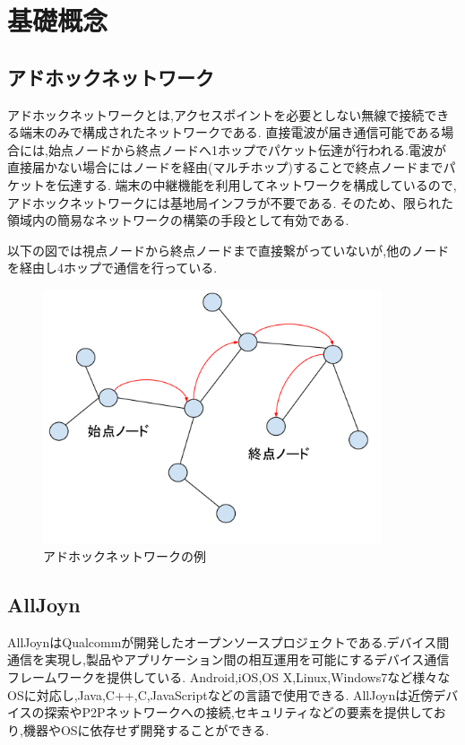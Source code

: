\chapter{基礎概念}
\label{chap:concept}

\section{アドホックネットワーク}
アドホックネットワーク\cite{アドホック}とは,アクセスポイントを必要としない無線で接続できる端末のみで構成されたネットワークである.
直接電波が届き通信可能である場合には,始点ノードから終点ノードへ1ホップでパケット伝達が行われる.電波が直接届かない場合にはノードを経由(マルチホップ)することで終点ノードまでパケットを伝達する.
端末の中継機能を利用してネットワークを構成しているので,アドホックネットワークには基地局インフラが不要である.
そのため、限られた領域内の簡易なネットワークの構築の手段として有効である.

以下の図では視点ノードから終点ノードまで直接繋がっていないが,他のノードを経由し4ホップで通信を行っている.

\begin{figure}[htbp]
\centering
\includegraphics[width=10cm]{fig/ad-hoc.pdf}
\caption{アドホックネットワークの例}
\end{figure}

\section{AllJoyn}
AllJoyn\cite{allseen}\cite{スライド}はQualcommが開発したオープンソースプロジェクトである.デバイス間通信を実現し,製品やアプリケーション間の相互運用を可能にするデバイス通信フレームワークを提供している.
Android,iOS,OS X,Linux,Windows7など様々なOSに対応し,Java,C++,C,JavaScriptなどの言語で使用できる.
AllJoynは近傍デバイスの探索やP2Pネットワークへの接続,セキュリティなどの要素を提供しており,機器やOSに依存せず開発することができる.



